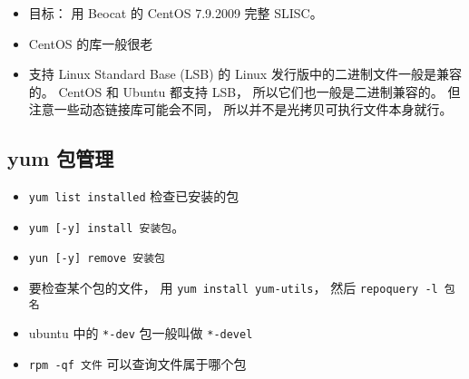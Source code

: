 
\begin{issues}
\issueDraft
\end{issues}

\begin{itemize}
\item 目标： 用 Beocat 的 CentOS 7.9.2009 完整 SLISC。
\item CentOS 的库一般很老
\item 支持 Linux Standard Base (LSB) 的 Linux 发行版中的二进制文件一般是兼容的。 CentOS 和 Ubuntu 都支持 LSB， 所以它们也一般是二进制兼容的。 但注意一些动态链接库可能会不同， 所以并不是光拷贝可执行文件本身就行。
\end{itemize}

\subsection{yum 包管理}
\begin{itemize}
\item \verb`yum list installed` 检查已安装的包
\item \verb`yum [-y] install 安装包`。
\item \verb`yun [-y] remove 安装包`
\item 要检查某个包的文件， 用 \verb`yum install yum-utils`， 然后 \verb`repoquery -l 包名`
\item ubuntu 中的 \verb`*-dev` 包一般叫做 \verb`*-devel`
\item \verb`rpm -qf 文件` 可以查询文件属于哪个包
\end{itemize}
